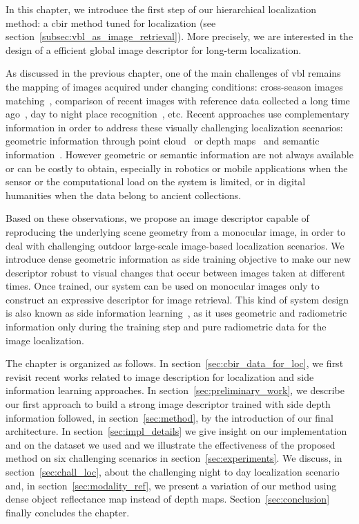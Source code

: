 In this chapter, we introduce the first step of our hierarchical localization method: a \ac{cbir} method tuned for localization (see section~\ref{subsec:vbl_as_image_retrieval}). More precisely, we are interested in the design of a efficient global image descriptor for long-term localization.

As discussed in the previous chapter, one of the main challenges of \ac{vbl} remains the mapping of images acquired under changing conditions: cross-season images matching~\cite{Naseer2017a}, comparison of recent images with reference data collected a long time ago~\cite{Toft2018}, day to night place recognition~\cite{Torii2015}, etc. Recent approaches use complementary information in order to address these visually challenging localization scenarios: geometric information through point cloud~\cite{Sattler2018,Schonberger2017a} or depth maps~\cite{Christie2016} and semantic information~\cite{Ardeshir2014,Christie2016,Naseer2017a}. However geometric or semantic information are not always available or can be costly to obtain, especially in robotics or mobile applications when the sensor or the computational load on the system is limited, or in digital humanities when the data belong to ancient collections.

Based on these observations, we propose an image descriptor capable of reproducing the underlying scene geometry from a monocular image, in order to deal with challenging outdoor large-scale image-based localization scenarios. We introduce dense geometric information as side training objective to make our new descriptor robust to visual changes that occur between images taken at different times. Once trained, our system can be used on monocular images only to construct an expressive descriptor for image retrieval. This kind of system design is also known as side information learning~\cite{Hoffman2016}, as it uses geometric and radiometric information only during the training step and pure radiometric data for the image localization.  

The chapter is organized as follows. In section~\ref{sec:cbir_data_for_loc}, we first revisit recent works related to image description for localization and side information learning approaches. In section~\ref{sec:preliminary_work}, we describe our first approach to build a strong image descriptor trained with side depth information followed, in section~\ref{sec:method}, by the introduction of our final architecture. In section~\ref{sec:impl_details} we give insight on our implementation and on the dataset we used and we illustrate the effectiveness of the proposed method on six challenging scenarios in section~\ref{sec:experiments}. We discuss, in section~\ref{sec:chall_loc}, about the challenging night to day localization scenario and, in section~\ref{sec:modality_ref}, we present a variation of our method using dense object reflectance map instead of depth maps. Section~\ref{sec:conclusion} finally concludes the chapter.